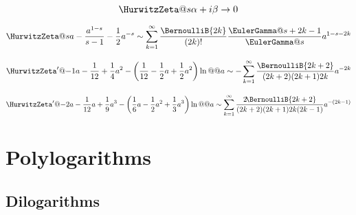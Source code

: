 \documentclass{article}
\begin{document}
\begin{equation}\label{eq:ZE.HZE.ASY2}
  \HurwitzZeta@{s}{\alpha+\iunit\beta} \to 0
\end{equation}

\begin{equation}\label{eq:ZE.HZE.ASY3}
  \HurwitzZeta@{s}{a}
  -
  \frac{a^{1-s}}{s-1}
  - \frac{1}{2} a^{-s}
  \sim \sum_{k=1}^{\infty}
        \frac{\BernoulliB{2k}}{(2k)!}
        \frac{\EulerGamma@{s+2k-1}}{\EulerGamma@{s}} a^{1-s-2k}
\end{equation}

 
\begin{equation}\label{eq:ZE.HZE.ASY4}
  \HurwitzZeta'@{-1}{a}
  -
  \frac{1}{12} + \frac{1}{4} a^2
  - \left( \frac{1}{12} - \frac{1}{2} a + \frac{1}{2} a^2 \right) \ln@@{a}
  \sim -\sum_{k=1}^\infty \frac{\BernoulliB{2k+2}}{(2k+2)(2k+1)2k} a^{-2k}
\end{equation}

\begin{equation}\label{eq:ZE.HZE.ASY5}
  \HurwitzZeta'@{-2}{a} - \frac{1}{12} a + \frac{1}{9} a^3
  - \left( \frac{1}{6} a - \frac{1}{2} a^2 + \frac{1}{3} a^3 \right) \ln@@{a}
  \sim
  \sum_{k=1}^\infty
      \frac{2\!\BernoulliB{2k+2}}{(2k+2)(2k+1)2k(2k-1)} a^{-(2k-1)}
\end{equation}

\section{Polylogarithms}\label{sec:ZE.JON}%

\subsection{Dilogarithms}\label{sec:ZE.JON.DI}%

 
\end{document}
